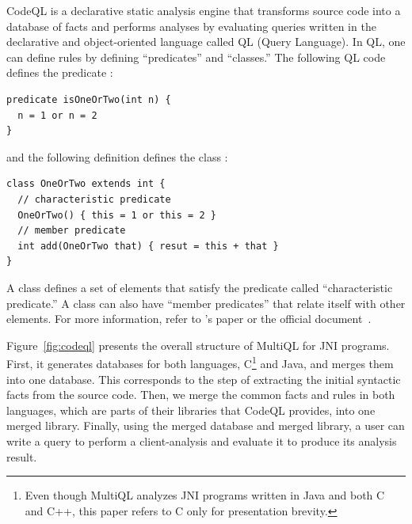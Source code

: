 CodeQL is a declarative static analysis engine that transforms source code into
a database of facts and performs analyses by evaluating queries written in the
declarative and object-oriented language called QL (Query Language).  In QL,
one can define rules by defining ``predicates'' and ``classes.'' The following
QL code defines the predicate :

\begin{lstlisting}[style=codeql,xleftmargin=2.5em]
predicate isOneOrTwo(int n) {
  n = 1 or n = 2
}
\end{lstlisting}

\noindent
and the following definition defines the class :

\begin{lstlisting}[style=codeql,xleftmargin=2.5em]
class OneOrTwo extends int {
  // characteristic predicate
  OneOrTwo() { this = 1 or this = 2 }
  // member predicate
  int add(OneOrTwo that) { resut = this + that }
}
\end{lstlisting}

\noindent
A class defines a set of elements that satisfy the predicate called
``characteristic predicate.'' A class can also have ``member predicates''
that relate itself with other elements. For more information, refer to
\citet{ql2016}'s paper or the official document~\cite{codeql}.


Figure~\ref{fig:codeql} presents the overall structure of MultiQL for JNI
programs.  First, it generates databases for both languages, C\footnote{ Even
though MultiQL analyzes JNI programs written in Java and both C and C++, this
paper refers to C only for presentation brevity.} and Java, and merges them into
one database.  This corresponds to the step of extracting the initial syntactic
facts from the source code.  Then, we merge the common facts and rules in both
languages, which are parts of their libraries that CodeQL provides, into one
merged library.  Finally, using the merged database and merged library, a user
can write a query to perform a client-analysis and evaluate it to produce its
analysis result.

